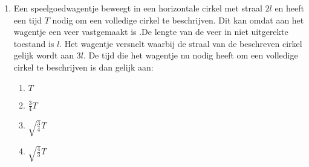\begin{enumerate}
\item Een speelgoedwagentje beweegt in een horizontale cirkel met straal
$2l$ en heeft een tijd $T$ nodig om een volledige cirkel te
beschrijven. Dit kan omdat aan het wagentje een veer vastgemaakt is
.De lengte van de veer in niet uitgerekte toestand is $l$. Het
wagentje versnelt waarbij de straal van de beschreven cirkel gelijk
wordt aan $3l$.
\newline
De tijd die het wagentje nu nodig heeft om een volledige cirkel te
beschrijven is dan gelijk aan:
\begin{enumerate}
\item $T$
\item $\frac{3}{4}T$
\item $\sqrt{\frac{3}{4}}T$
\item $\sqrt{\frac{4}{3}}T$
\end{enumerate}






\end{enumerate}
